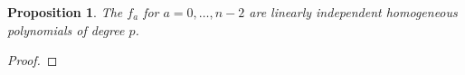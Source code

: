 \documentclass{article}
\numberwithin{equation}{section}
\newtheorem{proposition}[equation]{Proposition}
\begin{document}
\begin{proposition}\label{prop:linind} The $f_a$ for $a=0,\dots,n-2$ are linearly independent homogeneous polynomials of degree $p$.
\end{proposition} 

\begin{proof} 
%
%
%
%

\end{proof}
\end{document}
